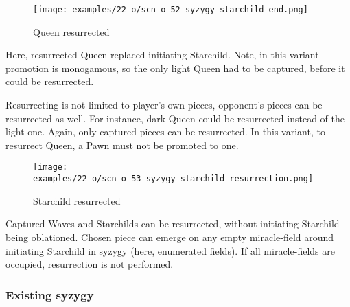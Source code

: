 \clearpage %

\vspace*{-2.1\baselineskip}
\noindent
\begin{figure}[!h]
\texttt{[image: examples/22\_o/scn\_o\_52\_syzygy\_starchild\_end.png]}
\vspace*{-1.4\baselineskip}
\caption{Queen resurrected}
\label{fig:scn_o_52_syzygy_starchild_end}
\end{figure}

\vspace*{-0.3\baselineskip}
Here, resurrected Queen replaced initiating Starchild. Note, in this variant
\hyperref[sec:One/Promotion]{promotion is monogamous}, so the only light Queen
had to be captured, before it could be resurrected.

Resurrecting is not limited to player's own pieces, opponent's pieces can be
resurrected as well. For instance, dark Queen could be resurrected instead of
the light one. Again, only captured pieces can be resurrected. In this variant,
to resurrect Queen, a Pawn must not be promoted to one.

\clearpage %

\vspace*{-2.1\baselineskip}
\noindent
\begin{figure}[!h]
\texttt{[image: examples/22\_o/scn\_o\_53\_syzygy\_starchild\_resurrection.png]}
\caption{Starchild resurrected}
\label{fig:scn_o_53_syzygy_starchild_resurrection}
\end{figure}

Captured Waves and Starchilds can be resurrected, without initiating Starchild being
oblationed. Chosen piece can emerge on any empty
\hyperref[fig:scn_o_05_miracle_fields]{miracle-field} around initiating Starchild in
syzygy (here, enumerated fields). If all miracle-fields are occupied, resurrection
is not performed.

\clearpage %

\subsubsection*{Existing syzygy}
\label{sec:One/Starchild/Syzygy/Existing syzygy}


